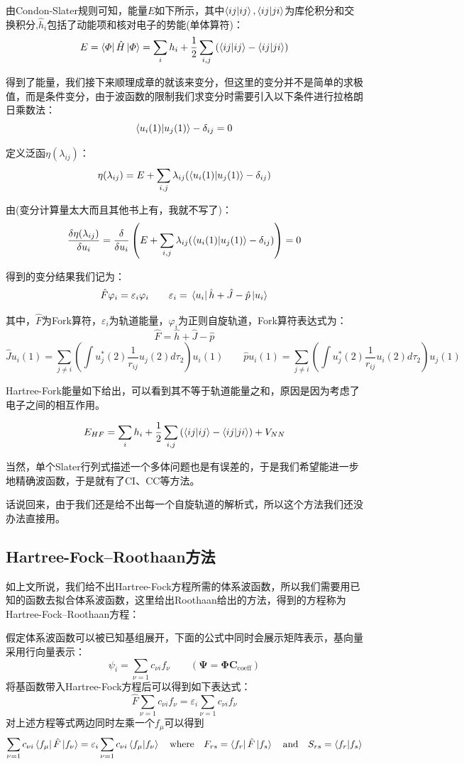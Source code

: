 由Condon-Slater规则可知，能量$E$如下所示，其中$\bra{ij}\ket{ij},\bra{ij}\ket{ji}$为库伦积分和交换积分,$\hat{h}_i$包括了动能项和核对电子的势能(单体算符)：
\[E=\bra{\varPhi}\hat{H}\ket{\varPhi}=\sum_ih_i+\frac{1}{2}\sum_{i,j}\left(\bra{ij}\ket{ij}-\bra{ij}\ket{ji}\right)\]

得到了能量，我们接下来顺理成章的就该来变分，但这里的变分并不是简单的求极值，而是条件变分，由于波函数的限制我们求变分时需要引入以下条件进行拉格朗日乘数法：
\[\bra{u_i(1)}\ket{u_j(1)}-\delta_{ij}=0\]

定义泛函$\eta(\lambda_{ij})$：
\[\eta(\lambda_{ij})=E+\sum_{i,j}\lambda_{ij}(\bra{u_i(1)}\ket{u_j(1)}-\delta_{ij})\]

由(变分计算量太大而且其他书上有，我就不写了)：
\[\frac{\delta\eta(\lambda_{ij})}{\delta u_i}=\frac{\delta}{\delta u_i}\left(E+\sum_{i,j}\lambda_{ij}(\bra{u_i(1)}\ket{u_j(1)}-\delta_{ij})\right)=0\]

得到的变分结果我们记为：
\[\hat{F}\varphi_i=\varepsilon_i\varphi_i \qquad \varepsilon_i=\bra*{u_i}\hat{h} + \hat{J} - \hat{p}\ket*{u_i}\]

其中，$\hat{F}$为Fork算符，$\varepsilon_i$为轨道能量，$\varphi_i$为正则自旋轨道，Fork算符表达式为：
\[\hat{F} = \hat{h} + \hat{J} - \hat{p}\]
\[\hat{J}u_i(1) = \sum_{j \neq i}\left(\int u_j^*(2)\frac{1}{r_{ij}}u_j(2)d\tau_2\right)u_i(1) \qquad \hat{p}u_i(1) = \sum_{j \neq i}\left(\int u_j^*(2)\frac{1}{r_{ij}}u_i(2)d\tau_2\right)u_j(1)\]

Hartree-Fork能量如下给出，可以看到其不等于轨道能量之和，原因是因为考虑了电子之间的相互作用。

\[E_{HF}=\sum_ih_i+\frac{1}{2}\sum_{i,j}\left(\bra{ij}\ket{ij}-\bra{ij}\ket{ji}\right)+V_{NN}\]

当然，单个Slater行列式描述一个多体问题也是有误差的，于是我们希望能进一步地精确波函数，于是就有了CI、CC等方法。

话说回来，由于我们还是给不出每一个自旋轨道的解析式，所以这个方法我们还没办法直接用。

\subsection{Hartree-Fock–Roothaan方法}
如上文所说，我们给不出Hartree-Fock方程所需的体系波函数，所以我们需要用已知的函数去拟合体系波函数，这里给出Roothaan给出的方法，得到的方程称为Hartree-Fock–Roothaan方程：

假定体系波函数可以被已知基组展开，下面的公式中同时会展示矩阵表示，基向量采用行向量表示：
\[\psi_i=\sum_{\nu=1}c_{\nu i}f_{\nu} \qquad (\mathbf{\Psi} = \mathbf{\Phi} \mathbf{C}_{\text{coeff}})\]
将基函数带入Hartree-Fock方程后可以得到如下表达式：
\[\hat{F}\sum_{\nu=1}c_{\nu i}f_{\nu}=\varepsilon_i\sum_{\nu=1}c_{\nu i}f_{\nu}\]
对上述方程等式两边同时左乘一个$f_{\mu}$可以得到
\[\sum_{\nu=1}c_{\nu i}\bra{f_{\mu}}\hat{F}\ket{f_{\nu}}=\varepsilon_i\sum_{\nu=1}c_{\nu i}\bra{f_{\mu}}\ket{f_{\nu}} \quad \text{where} \quad F_{rs}=\bra{f_r}\hat{F}\ket{f_s} \quad \text{and} \quad S_{rs}=\bra{f_r}\ket{f_s}\]

